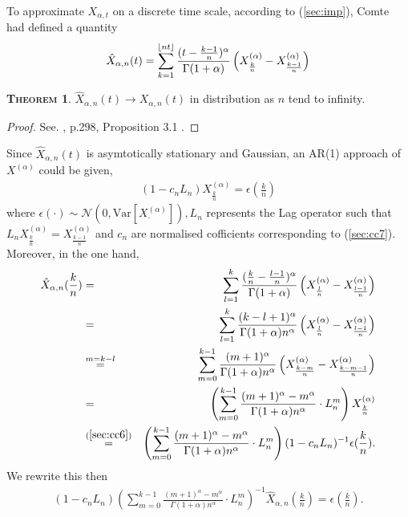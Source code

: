 \documentclass[a4paper, twoside, 11pt]{article}
\theoremstyle{definition}
\newtheorem{theorem}[definition]{\scshape Theorem}
\DeclarePairedDelimiter\floor{\lfloor}{\rfloor}
\newcommand{\brkt}[1]{\left({#1} \right)}
\begin{document}
To approximate $ X_{\alpha,t}$ on a discrete time scale, according to (\ref{sec:imp}), Comte had defined a quantity
\begin{eqnarray}
 \hat{X}_{\alpha,n}(t) = \sum_{k=1}^{\floor{nt}} \frac{(t - \frac{k-1}{n})^\alpha}{\Gamma(1+\alpha)} \brkt{X^{(\alpha)}_{\frac{k}{n}} - X^{(\alpha)}_{\frac{k-1}{n}}}
  \label{sec:cc7}
\end{eqnarray}
\begin{theorem}
  $\hat{X}_{\alpha,n}(t)\rightarrow X_{\alpha,n}(t)$ in distribution as $n$ tend to infinity.  
  \label{sec:cont}
\end{theorem}
\begin{proof}
  See. \cite{comren}, p.298, Proposition 3.1 .
\end{proof}
Since $\hat{X}_{\alpha, n}(t)$ is asymtotically stationary and Gaussian,  an AR(1) approach of $X^{(\alpha)}$ could be given,
\begin{eqnarray}
  (1-c_nL_n) {X}^{(\alpha)}_{\frac{k}{n}} = \epsilon(\frac{k}{n})
  \label{sec:cc6}
\end{eqnarray}
where $\epsilon(\cdot) \sim \mathcal{N}(0, \mathrm{Var}[X^{(\alpha)}_{\cdot}]), L_n $ represents the Lag operator such that $L_n X^{(\alpha)}_{\frac{k}{n}} = X^{(\alpha)}_{\frac{k-1}{n}}$  and $c_n$ are normalised cofficients corresponding to (\ref{sec:cc7}). Moreover, in the one hand,
\begin{eqnarray}
  \hat{X}_{\alpha,n}(\frac{k}{n}) &=& \sum_{l=1}^{k} \frac{(\frac{k}{n} - \frac{l-1}{n})^\alpha}{\Gamma(1+\alpha)} \brkt{X^{(\alpha)}_{\frac{l}{n}} - X^{(\alpha)}_{\frac{l-1}{n}}}\nonumber\\
  &=& \sum_{l=1}^{k} \frac{(k - l + 1)^\alpha}{\Gamma(1+\alpha)n^\alpha} \brkt{X^{(\alpha)}_{\frac{l}{n}} - X^{(\alpha)}_{\frac{l-1}{n}}}\nonumber\\
  &\overset{m=k-l}{=}& \sum_{m=0}^{k-1} \frac{(m + 1)^\alpha}{\Gamma(1+\alpha)n^\alpha} \brkt{X^{(\alpha)}_{\frac{k-m}{n}} - X^{(\alpha)}_{\frac{k-m-1}{n}}}\nonumber\\ 
  &=& \brkt{\sum_{m=0}^{k-1} \frac{(m + 1)^\alpha - m^\alpha}{\Gamma(1+\alpha)n^\alpha} \cdot L_n^m} X^{(\alpha)}_{\frac{k}{n}} \nonumber\\
  &\overset{(\ref{sec:cc6})}{=}&  \brkt{\sum_{m=0}^{k-1} \frac{(m + 1)^\alpha - m^\alpha}{\Gamma(1+\alpha)n^\alpha} \cdot L_n^m} (1-c_nL_n)^{-1}\epsilon(\frac{k}{n}).
\end{eqnarray}
We rewrite this then
\begin{eqnarray*}
  (1-c_nL_n)\brkt{\sum_{m=0}^{k-1} \frac{(m + 1)^\alpha - m^\alpha}{\Gamma(1+\alpha)n^\alpha} \cdot L_n^m}^{-1}  \hat{X}_{\alpha,n}(\frac{k}{n}) =\epsilon(\frac{k}{n}).
\end{eqnarray*}
\end{document}
